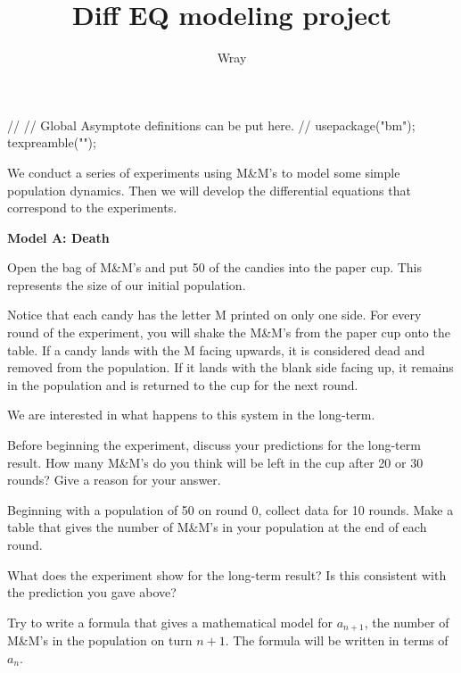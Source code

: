 \documentclass[addpoints, 12pt]{exam}
\title{Diff EQ modeling project}
\author{Wray}
\newcommand{\mnms}{M\&M's }
\begin{document}
\begin{asydef}
//
// Global Asymptote definitions can be put here.
//
usepackage("bm");
texpreamble("\def\V#1{\bm{#1}}");
\end{asydef}



\bigskip
\bigskip

We conduct a series of experiments using \mnms to model some simple population dynamics.  Then we will develop the differential equations that correspond to the experiments.  

\bigskip
\textbf{Model A: Death}
\bigskip

Open the bag of \mnms and put 50 of the candies into the paper cup.  This represents the size of our initial population.  

\bigskip
Notice that each candy has the letter M printed on only one side.  For every round of the experiment, you will shake the \mnms from the paper cup onto the table.  If a candy lands with the M facing upwards, it is considered dead and removed from the population.  If it lands with the blank side facing up, it remains in the population and is returned to the cup for the next round.  

\bigskip
We are interested in what happens to this system in the long-term.

\smallskip

\begin{questions}

\question
Before beginning the experiment, discuss your predictions for the long-term result.  How many \mnms do you think will be left in the cup after 20 or 30 rounds?  Give a reason for your answer.


\question
Beginning with a population of 50 on round 0, collect data for 10 rounds.  Make a table that gives the number of \mnms in your population at the end of each round.


\question
What does the experiment show for the long-term result? Is this consistent with the prediction you gave above?


\clearpage

\question
Try to write a formula that gives a mathematical model for $a_{n+1}$, the number of \mnms in the population on turn $n+1$.  The formula will be written in terms of $a_n$.


\end{questions}
\end{document}
